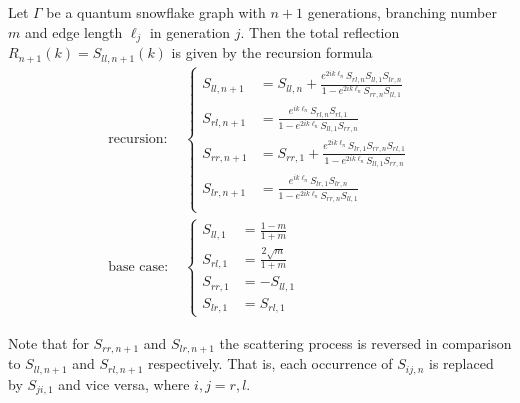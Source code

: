 \begin{proposition}
  Let $\Gamma$ be a quantum snowflake graph with $n+1$ generations, branching number $m$ and edge length $\ell_j$ in generation $j$. Then the total reflection $R_{n+1}(k) = S_{ll,n+1}(k)$ is given by the recursion formula
  \begin{equation}\label{eq: recursion}
    \begin{aligned}
      \text{recursion: } & \left\lbrace\!\!
      \begin{aligned}
        S_{ll,n+1} &= S_{ll,n} + \frac{e^{2ik\ell_n} S_{rl,n} S_{ll,1} S_{lr,n}}{1 - e^{2ik\ell_n} S_{rr,n} S_{ll,1}} \\
        S_{rl,n+1} &= \frac{e^{ik\ell_n} S_{rl,n} S_{rl,1}}{1 - e^{2ik\ell_n} S_{ll,1} S_{rr,n}} \\
        S_{rr,n+1} &= S_{rr,1} + \frac{e^{2ik\ell_n} S_{lr,1} S_{rr,n} S_{rl,1}}{1 - e^{2ik\ell_n} S_{ll,1} S_{rr,n}} \\
        S_{lr,n+1} &= \frac{e^{ik\ell_n} S_{lr,1}S_{lr,n}}{1 - e^{2ik\ell_n} S_{rr,n} S_{ll,1}} \\
      \end{aligned}\right. \\
      \text{base case: } & \left\lbrace\!\!
      \begin{aligned}
        S_{ll,1} &= \frac{1-m}{1+m} \\
        S_{rl,1} &= \frac{2\sqrt{m}}{1+m} \\
        S_{rr,1} &= -S_{ll,1} \\
        S_{lr,1} &= S_{rl,1}
      \end{aligned}\right.
    \end{aligned}
  \end{equation}
\end{proposition}

Note that for $S_{rr,n+1}$ and $S_{lr,n+1}$ the scattering process is reversed in comparison to $S_{ll,n+1}$ and $S_{rl,n+1}$ respectively. That is, each occurrence of $S_{ij,n}$ is replaced by $S_{ji,1}$ and vice versa, where $i,j=r,l$.


